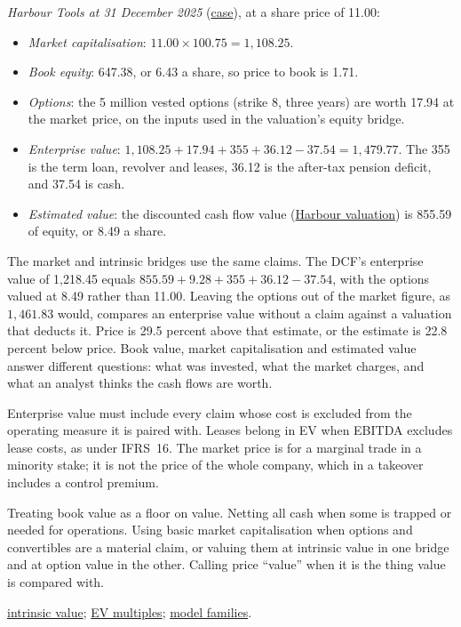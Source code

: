 \begin{qfdefinition}
 \emph{Harbour Tools at 31 December 2025} (\hyperref[ex:harbour-tools-statements]{case}), at a share price of 11.00:
\begin{itemize}
\item \emph{Market capitalisation}: $11.00\times100.75=1{,}108.25$.
\item \emph{Book equity}: 647.38, or 6.43 a share, so price to book is 1.71.
\item \emph{Options}: the 5 million vested options (strike 8, three years) are worth 17.94 at the market price, on the inputs used in the valuation's equity bridge.
\item \emph{Enterprise value}: $1{,}108.25+17.94+355+36.12-37.54=1{,}479.77$. The 355 is the term loan, revolver and leases, 36.12 is the after-tax pension deficit, and 37.54 is cash.
\item \emph{Estimated value}: the discounted cash flow value (\hyperref[meth:forecast-horizon-steady-state]{Harbour valuation}) is 855.59 of equity, or 8.49 a share.
\end{itemize}
The market and intrinsic bridges use the same claims. The DCF's enterprise value of 1,218.45 equals $855.59+9.28+355+36.12-37.54$, with the options valued at 8.49 rather than 11.00. Leaving the options out of the market figure, as $1{,}461.83$ would, compares an enterprise value without a claim against a valuation that deducts it.
Price is 29.5 percent above that estimate, or the estimate is 22.8 percent below price. Book value, market capitalisation and estimated value answer different questions: what was invested, what the market charges, and what an analyst thinks the cash flows are worth.

 Enterprise value must include every claim whose cost is excluded from the operating measure it is paired with. Leases belong in EV when EBITDA excludes lease costs, as under IFRS~16. The market price is for a marginal trade in a minority stake; it is not the price of the whole company, which in a takeover includes a control premium.

 Treating book value as a floor on value. Netting all cash when some is trapped or needed for operations. Using basic market capitalisation when options and convertibles are a material claim, or valuing them at intrinsic value in one bridge and at option value in the other. Calling price ``value'' when it is the thing value is compared with.

 \hyperref[def:intrinsic-value-mispricing]{intrinsic value}; \hyperref[meth:enterprise-value-multiples]{EV multiples}; \hyperref[def:valuation-model-families]{model families}.

\end{qfdefinition}

